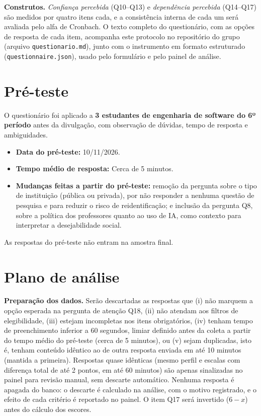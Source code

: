 \documentclass[11pt,a4paper]{article}
\begin{document}
\textbf{Construtos.} \emph{Confiança percebida} (Q10--Q13) e \emph{dependência percebida} (Q14--Q17) são medidos por quatro itens cada, e a consistência interna de cada um será avaliada pelo alfa de Cronbach. O texto completo do questionário, com as opções de resposta de cada item, acompanha este protocolo no repositório do grupo (arquivo \texttt{questionario.md}), junto com o instrumento em formato estruturado (\texttt{questionnaire.json}), usado pelo formulário e pelo painel de análise.

\section{Pré-teste}

O questionário foi aplicado a \textbf{3 estudantes de engenharia de software do 6º período} antes da divulgação, com observação de dúvidas, tempo de resposta e ambiguidades.

\begin{itemize}
  \item \textbf{Data do pré-teste:} 10/11/2026.
  \item \textbf{Tempo médio de resposta:} Cerca de 5 minutos.
  \item \textbf{Mudanças feitas a partir do pré-teste:} remoção da pergunta sobre o tipo de instituição (pública ou privada), por não responder a nenhuma questão de pesquisa e para reduzir o risco de reidentificação; e inclusão da pergunta Q8, sobre a política dos professores quanto ao uso de IA, como contexto para interpretar a desejabilidade social.
\end{itemize}

As respostas do pré-teste não entram na amostra final.

\section{Plano de análise}

\textbf{Preparação dos dados.} Serão descartadas as respostas que (i) não marquem a opção esperada na pergunta de atenção Q18, (ii) não atendam aos filtros de elegibilidade, (iii) estejam incompletas nos itens obrigatórios, (iv) tenham tempo de preenchimento inferior a 60 segundos, limiar definido antes da coleta a partir do tempo médio do pré-teste (cerca de 5 minutos), ou (v) sejam duplicadas, isto é, tenham conteúdo idêntico ao de outra resposta enviada em até 10 minutos (mantida a primeira). Respostas quase idênticas (mesmo perfil e escalas com diferença total de até 2 pontos, em até 60 minutos) são apenas sinalizadas no painel para revisão manual, sem descarte automático. Nenhuma resposta é apagada do banco: o descarte é calculado na análise, com o motivo registrado, e o efeito de cada critério é reportado no painel. O item Q17 será invertido ($6 - x$) antes do cálculo dos escores.
\end{document}
